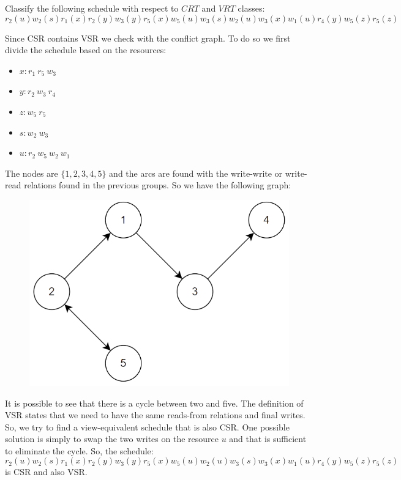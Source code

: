 \documentclass[12pt, a4paper]{report}
\newtheorem[style=M,bodystyle=\normalfont]{theorem}{Theorem}
\newtheorem[style=M,bodystyle=\normalfont]{corollary}{Corollary}
\newtheorem[style=M,bodystyle=\normalfont]{lemma}{Lemma}
\newtheorem[style=M,bodystyle=\normalfont]{definition}{Definition}
\begin{document}
    \begin{Exercise}[label=4]
        Classify the following schedule with respect to $CRT$ and $VRT$ classes: 
        \[r_2(u) w_2(s) r_1(x) r_2(y) w_3(y) r_5(x) w_5(u) w_3(s)w_2(u) w_3(x) w_1(u) r_4(y) w_5(z) r_5(z)\]
    \end{Exercise}
    \begin{Answer}[ref=4]
        Since CSR contains VSR we check with the conflict graph. To do so we first divide the schedule based on the resources: 
        \begin{itemize}
            \item $x: r_1 \: r_5 \:w_3$
            \item $y: r_2 \: w_3 \:r_4$
            \item $z: w_5 \: r_5$
            \item $s: w_2 \: w_3$
            \item $u: r_2 \: w_5 \: w_2 \:w_1$
        \end{itemize}
        The nodes are $\{1,2,3,4,5\}$ and the arcs are found with the write-write or write-read relations found in the previous groups. So we have the following graph:
        \begin{figure}[H]
            \centering
            \includegraphics[width=0.5\linewidth]{images/conflictgraph1.png}
        \end{figure}
        It is possible to see that there is a cycle between two and five. The definition of VSR states that we need to have the same reads-from relations and final writes. So, we try to find a view-equivalent 
        schedule that is also CSR. One possible solution is simply to swap the two writes on the resource $u$ and that is sufficient to eliminate the cycle. So, the schedule: 
        \[r_2(u) w_2(s) r_1(x) r_2(y) w_3(y) r_5(x) w_5(u) w_2(u) w_3(s) w_3(x) w_1(u) r_4(y) w_5(z) r_5(z)\]
        is CSR and also VSR. 
    \end{Answer}

    \newpage
    
\end{document}
